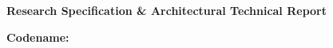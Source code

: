 \documentclass[11pt,a4paper]{report}
\begin{document}
\begin{titlepage}
    \centering
    \vspace*{1.5cm}
    {\Huge \textbf{\projectTitle}\par}
    \vspace{1cm}
    {\Large \textbf{Research Specification \& Architectural Technical Report}\par}
    \vspace{0.5cm}
    {\large \textbf{Codename:} \texttt{\projectCodename}\par}
    \vspace{2cm}
    {\Large \textbf{\authorName}\par}
    {\normalsize \authorRoll\par}
    \vspace{0.5cm}
    {\normalsize \authorDepartment\par}
    {\normalsize \institutionName\par}
    \vfill
    {\large \reportDate\par}
\end{titlepage}

\tableofcontents
\newpage







\end{document}
